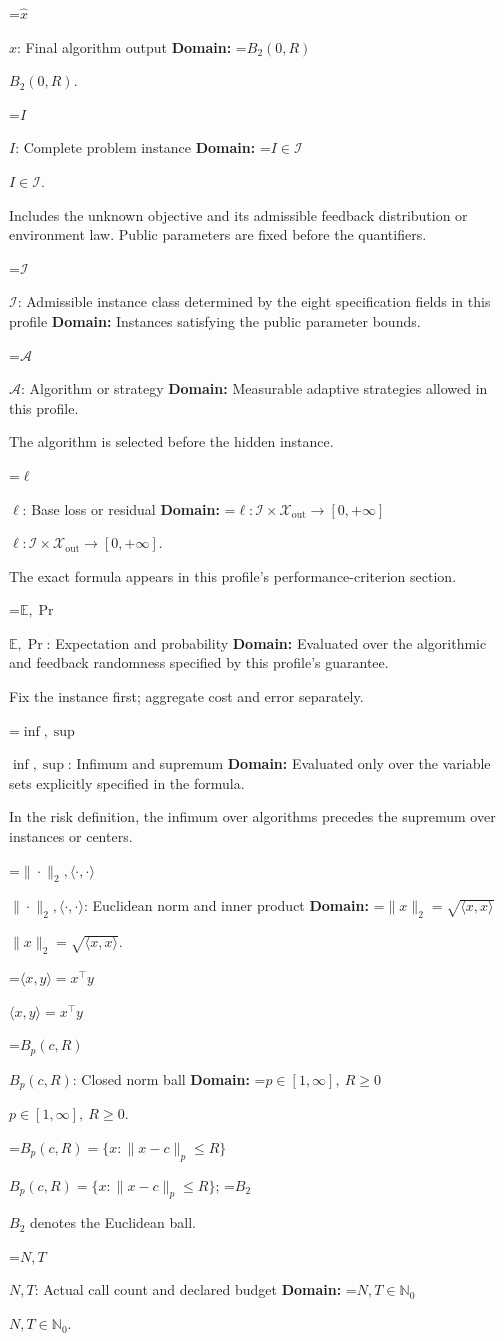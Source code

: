 \documentclass[10pt,a4paper]{article}
\newcommand{\AtlasMath}[1]{\par\begingroup\centering\setbox0=\hbox{$\displaystyle #1$}\ifdim\wd0>1.4\linewidth\typeout{ATLAS WIDE FORMULA: \the\wd0}\fi\ifdim\wd0>\linewidth\resizebox{\linewidth}{!}{\box0}\else\box0\fi\par\endgroup}
\newcommand{\AtlasInlineMath}[1]{\begingroup\setbox0=\hbox{$#1$}\ifdim\wd0>.4\linewidth\endgroup\AtlasMath{#1}\else\endgroup$#1$\fi}
\begin{document}
\AtlasInlineMath{\widehat{x}}: Final algorithm output \textbf{Domain:} \AtlasInlineMath{B_2(0,R)}.

\AtlasInlineMath{I}: Complete problem instance \textbf{Domain:} \AtlasInlineMath{I\in\mathcal{I}}.

Includes the unknown objective and its admissible feedback distribution or environment law. Public parameters are fixed before the quantifiers.

\AtlasInlineMath{\mathcal{I}}: Admissible instance class determined by the eight specification fields in this profile \textbf{Domain:} Instances satisfying the public parameter bounds.

\AtlasInlineMath{\mathcal{A}}: Algorithm or strategy \textbf{Domain:} Measurable adaptive strategies allowed in this profile.

The algorithm is selected before the hidden instance.

\AtlasInlineMath{\ell}: Base loss or residual \textbf{Domain:} \AtlasInlineMath{\ell:\mathcal{I}\times\mathcal{X}_{\mathrm{out}}\to[0,+\infty]}.

The exact formula appears in this profile's performance-criterion section.

\AtlasInlineMath{\mathbb{E},\Pr}: Expectation and probability \textbf{Domain:} Evaluated over the algorithmic and feedback randomness specified by this profile's guarantee.

Fix the instance first; aggregate cost and error separately.

\AtlasInlineMath{\inf,\sup}: Infimum and supremum \textbf{Domain:} Evaluated only over the variable sets explicitly specified in the formula.

In the risk definition, the infimum over algorithms precedes the supremum over instances or centers.

\AtlasInlineMath{\|\cdot\|_2,\langle\cdot,\cdot\rangle}: Euclidean norm and inner product \textbf{Domain:} \AtlasInlineMath{\|x\|_2=\sqrt{\langle x,x\rangle}}.

\AtlasInlineMath{\langle x,y\rangle=x^\top y}

\AtlasInlineMath{B_p(c,R)}: Closed norm ball \textbf{Domain:} \AtlasInlineMath{p\in[1,\infty],\ R\ge0}.

\AtlasInlineMath{B_p(c,R)=\{x:\|x-c\|_p\le R\}}; \AtlasInlineMath{B_2} denotes the Euclidean ball.

\AtlasInlineMath{N,T}: Actual call count and declared budget \textbf{Domain:} \AtlasInlineMath{N,T\in\mathbb{N}_0}.
\end{document}
